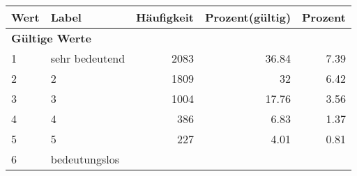      \begin{longtable}{lXrrr}
     \toprule
     \textbf{Wert} & \textbf{Label} & \textbf{Häufigkeit} & \textbf{Prozent(gültig)} & \textbf{Prozent} \\
     \endhead
     \midrule
     \multicolumn{5}{l}{\textbf{Gültige Werte}}\\

     1 &
     \multicolumn{1}{X}{ sehr bedeutend   } &


       \num{2083} &
       \num[round-mode=places,round-precision=2]{36,84} &
         \num[round-mode=places,round-precision=2]{7,39} \\

     2 &
     \multicolumn{1}{X}{ 2   } &


       \num{1809} &
       \num[round-mode=places,round-precision=2]{32} &
         \num[round-mode=places,round-precision=2]{6,42} \\

     3 &
     \multicolumn{1}{X}{ 3   } &


       \num{1004} &
       \num[round-mode=places,round-precision=2]{17,76} &
         \num[round-mode=places,round-precision=2]{3,56} \\

     4 &
     \multicolumn{1}{X}{ 4   } &


       \num{386} &
       \num[round-mode=places,round-precision=2]{6,83} &
         \num[round-mode=places,round-precision=2]{1,37} \\

     5 &
     \multicolumn{1}{X}{ 5   } &


       \num{227} &
       \num[round-mode=places,round-precision=2]{4,01} &
         \num[round-mode=places,round-precision=2]{0,81} \\

     6 &
     \multicolumn{1}{X}{ bedeutungslos   } &



\end{longtable}
